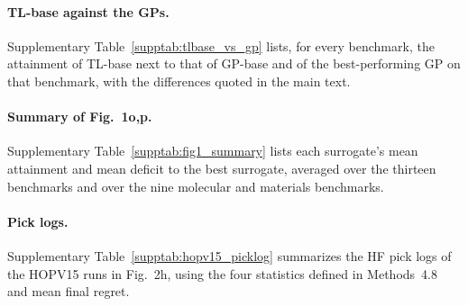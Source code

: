 \paragraph{TL-base against the GPs.} Supplementary Table~\ref{supptab:tlbase_vs_gp} lists, for every benchmark, the attainment of TL-base next to that of GP-base and of the best-performing GP on that benchmark, with the differences quoted in the main text.

\paragraph{Summary of Fig.~1o,p.} Supplementary Table~\ref{supptab:fig1_summary} lists each surrogate's mean attainment and mean deficit to the best surrogate, averaged over the thirteen benchmarks and over the nine molecular and materials benchmarks.

\paragraph{Pick logs.} Supplementary Table~\ref{supptab:hopv15_picklog} summarizes the HF pick logs of the HOPV15 runs in Fig.~2h, using the four statistics defined in Methods~4.8 and mean final regret.

